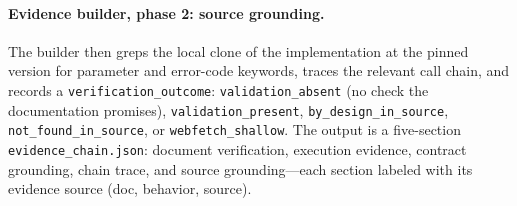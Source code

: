 \documentclass[acmsmall,screen,review,anonymous]{acmart}
\begin{document}
\paragraph{Evidence builder, phase 2: source grounding.}
The builder then greps the local clone of the implementation at the pinned version for parameter and error-code keywords, traces the relevant call chain, and records a \texttt{verification\_outcome}: \texttt{validation\_absent} (no check the documentation promises), \texttt{validation\_present}, \texttt{by\_design\_in\_source}, \texttt{not\_found\_in\_source}, or \texttt{webfetch\_shallow}. The output is a five-section \texttt{evidence\_chain.json}: document verification, execution evidence, contract grounding, chain trace, and source grounding---each section labeled with its evidence source (doc, behavior, source).
\end{document}
